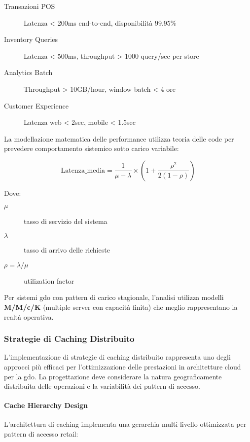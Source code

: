 \begin{description}
    \item[Transazioni POS] Latenza < 200ms end-to-end, disponibilità 99.95\%
    \item[Inventory Queries] Latenza < 500ms, throughput > 1000 query/sec per store
    \item[Analytics Batch] Throughput > 10GB/hour, window batch < 4 ore
    \item[Customer Experience] Latenza web < 2sec, mobile < 1.5sec
\end{description}

La modellazione matematica delle performance utilizza teoria delle code per prevedere comportamento sistemico sotto carico variabile:

\begin{equation}
\text{Latenza\_media} = \frac{1}{\mu - \lambda} \times \left(1 + \frac{\rho^2}{2(1-\rho)}\right)
\label{eq:latenza-media-queue}
\end{equation}

Dove:
\begin{description}
    \item[$\mu$] tasso di servizio del sistema
    \item[$\lambda$] tasso di arrivo delle richieste
    \item[$\rho = \lambda/\mu$] utilization factor
\end{description}

Per sistemi \gls{gdo} con pattern di carico stagionale, l'analisi utilizza modelli \textbf{M/M/c/K} (multiple server con capacità finita) che meglio rappresentano la realtà operativa.

\subsubsection{Strategie di Caching Distribuito}

L'implementazione di strategie di caching distribuito rappresenta uno degli approcci più efficaci per l'ottimizzazione delle prestazioni in architetture cloud per la \gls{gdo}. La progettazione deve considerare la natura geograficamente distribuita delle operazioni e la variabilità dei pattern di accesso.

\paragraph{Cache Hierarchy Design}

L'architettura di caching implementa una gerarchia multi-livello ottimizzata per pattern di accesso retail:

